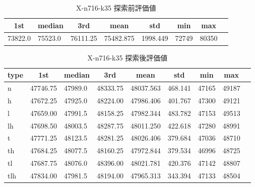 \begin{table}[htbp]
    \caption{X-n716-k35 探索前評価値}
    \begin{tabular}{|l|l|l|l|l|l|l|l|}\hline
    \multicolumn{1}{|c|}{\textbf{1st}}
    &\multicolumn{1}{c|}{\textbf{median}}
    &\multicolumn{1}{c|}{\textbf{3rd}}
    &\multicolumn{1}{c|}{\textbf{mean}}
    &\multicolumn{1}{c|}{\textbf{std}}
    &\multicolumn{1}{c|}{\textbf{min}}
    &\multicolumn{1}{c|}{\textbf{max}}\\\hline
	73822.0 & 75523.0 & 76111.25 & 75482.875 & 1998.449 & 72749 & 80350\\\hline
	\end{tabular}
\end{table}
\begin{table}[htbp]
    \caption{X-n716-k35 探索後評価値}
    \begin{tabular}{|l|l|l|l|l|l|l|l|l|}\hline
    \multicolumn{1}{|c|}{\textbf{type}}
    &\multicolumn{1}{|c|}{\textbf{1st}}
    &\multicolumn{1}{c|}{\textbf{median}}
    &\multicolumn{1}{c|}{\textbf{3rd}}
    &\multicolumn{1}{c|}{\textbf{mean}}
    &\multicolumn{1}{c|}{\textbf{std}}
    &\multicolumn{1}{c|}{\textbf{min}}
    &\multicolumn{1}{c|}{\textbf{max}}\\\hline
	n & 47746.75 & 47989.0 & 48333.75 & 48037.563 & 468.141 & 47165 & 49187\\\hline
	h & 47672.25 & 47925.0 & 48224.00 & 47986.406 & 401.767 & 47300 & 49121\\\hline
	l & 47659.00 & 47991.5 & 48158.25 & 47982.344 & 483.782 & 47153 & 49513\\\hline
	lh & 47698.50 & 48003.5 & 48287.75 & 48011.250 & 422.618 & 47280 & 48991\\\hline
	t & 47771.25 & 48123.5 & 48281.25 & 48026.406 & 379.684 & 47036 & 48710\\\hline
	th & 47684.25 & 48077.5 & 48160.25 & 47972.844 & 379.534 & 46996 & 48725\\\hline
	tl & 47687.75 & 48076.0 & 48396.00 & 48021.781 & 420.376 & 47142 & 48807\\\hline
	tlh & 47834.00 & 47981.5 & 48194.00 & 47965.313 & 343.394 & 47133 & 48504\\\hline
	\end{tabular}
\end{table}
